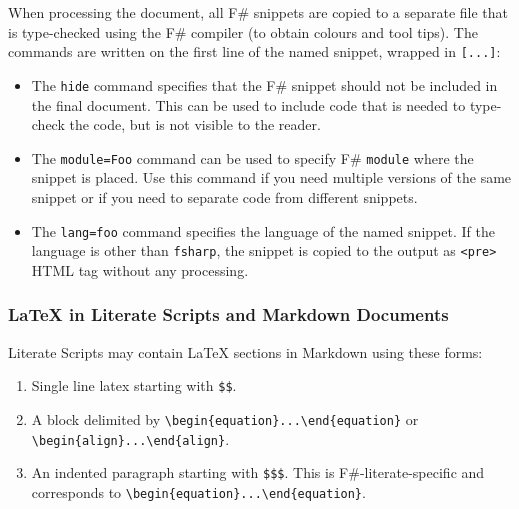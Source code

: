 \documentclass{article}
\begin{document}
When processing the document, all F\# snippets are copied to a separate file that
is type-checked using the F\# compiler (to obtain colours and tool tips).
The commands are written on the first line of the named snippet, wrapped in \texttt{[...]}:
\begin{itemize}
\item 

The \texttt{hide} command specifies that the F\# snippet should not be included in the
final document. This can be used to include code that is needed to type-check
the code, but is not visible to the reader.

\item 

The \texttt{module=Foo} command can be used to specify F\# \texttt{module} where the snippet
is placed. Use this command if you need multiple versions of the same snippet
or if you need to separate code from different snippets.

\item 

The \texttt{lang=foo} command specifies the language of the named snippet. If the language
is other than \texttt{fsharp}, the snippet is copied to the output as \texttt{<pre>} HTML
tag without any processing.

\end{itemize}

\subsubsection*{LaTeX in Literate Scripts and Markdown Documents}



Literate Scripts may contain LaTeX sections in Markdown using these forms:
\begin{enumerate}
\item 

Single line latex starting with \texttt{\$\$}.

\item 

A block delimited by \texttt{{\textbackslash}begin\{equation\}...{\textbackslash}end\{equation\}} or \texttt{{\textbackslash}begin\{align\}...{\textbackslash}end\{align\}}.

\item 

An indented paragraph starting with \texttt{\$\$\$}.  This is F\#-literate-specific and corresponds to
\texttt{{\textbackslash}begin\{equation\}...{\textbackslash}end\{equation\}}.

\end{enumerate}
\end{document}
